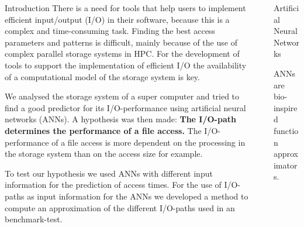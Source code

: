\documentclass[final]{beamer}
\newlength{\sepwid}
\newlength{\onecolwid}
\begin{document}
\begin{frame}[t]
\begin{columns}[t]
\begin{column}{\onecolwid}
\begin{block}{Introduction}
There is a need for tools that help users to implement efficient input/output (I/O) in their software, because this is a complex and time-consuming task. Finding the best access parameters and patterns is difficult, mainly because of the use of complex parallel storage systems in HPC.
For the development of tools to support the implementation of efficient I/O the availability of a computational model of the storage system is key.\medskip

We analysed the storage system of a super computer and tried to find a good predictor for its I/O-performance using artificial neural networks (ANNs).
A hypothesis was then made: \textbf{The I/O-path determines the performance of a file access.}
The I/O-performance of a file access is more dependent on the processing in the storage system than on the access size for example.\medskip

To test our hypothesis we used ANNs with different input information for the prediction of access times.
For the use of I/O-paths as input information for the ANNs we developed a method to compute an approximation of the different I/O-paths used in an benchmark-test.

\end{block}




\end{column} %

\begin{column}{\sepwid}\end{column} %

\begin{column}{\onecolwid} %
	
\begin{block}{Artificial Neural Networks}
	
	ANNs are bio-inspired function approximators.
	
	

\end{block}
\end{column}
\end{columns}
\end{frame}
\end{document}
